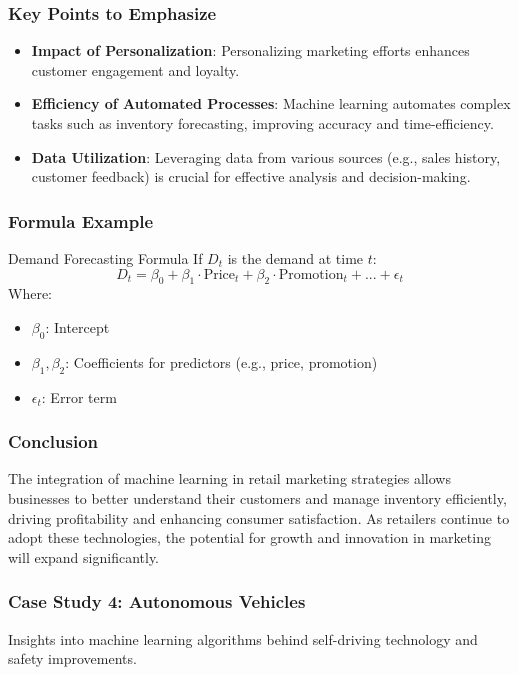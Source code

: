 \documentclass{beamer}
\begin{document}
\begin{frame}[fragile]
    \frametitle{Key Points to Emphasize}
    \begin{itemize}
        \item \textbf{Impact of Personalization}: Personalizing marketing efforts enhances customer engagement and loyalty.
        \item \textbf{Efficiency of Automated Processes}: Machine learning automates complex tasks such as inventory forecasting, improving accuracy and time-efficiency.
        \item \textbf{Data Utilization}: Leveraging data from various sources (e.g., sales history, customer feedback) is crucial for effective analysis and decision-making.
    \end{itemize}
\end{frame}

\begin{frame}[fragile]
    \frametitle{Formula Example}
    \begin{block}{Demand Forecasting Formula}
        If \( D_t \) is the demand at time \( t \):
        \begin{equation}
        D_t = \beta_0 + \beta_1 \cdot \text{Price}_t + \beta_2 \cdot \text{Promotion}_t + ... + \epsilon_t
        \end{equation}
        Where:
        \begin{itemize}
            \item \( \beta_0 \): Intercept
            \item \( \beta_1, \beta_2 \): Coefficients for predictors (e.g., price, promotion)
            \item \( \epsilon_t \): Error term
        \end{itemize}
    \end{block}
\end{frame}

\begin{frame}[fragile]
    \frametitle{Conclusion}
    The integration of machine learning in retail marketing strategies allows businesses to better understand their customers and manage inventory efficiently, driving profitability and enhancing consumer satisfaction. 
    As retailers continue to adopt these technologies, the potential for growth and innovation in marketing will expand significantly.
\end{frame}

\begin{frame}[fragile]
    \frametitle{Case Study 4: Autonomous Vehicles}
    Insights into machine learning algorithms behind self-driving technology and safety improvements.
\end{frame}
\end{document}
